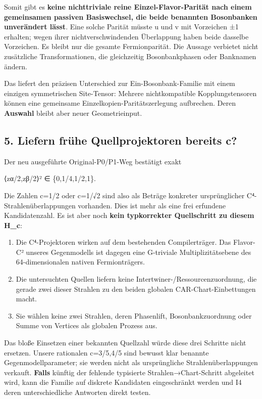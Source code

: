 Somit gibt es \textbf{keine nichttriviale reine Einzel-Flavor-Parität
nach einem gemeinsamen passiven Basiswechsel, die beide benannten
Bosonbanken unverändert lässt}. Eine solche Parität müsste u und v mit
Vorzeichen ±1 erhalten; wegen ihrer nichtverschwindenden Überlappung
haben beide dasselbe Vorzeichen. Es bleibt nur die gesamte
Fermionparität. Die Aussage verbietet nicht zusätzliche
Transformationen, die gleichzeitig Bosonbankphasen oder Banknamen
ändern.

Das liefert den präzisen Unterschied zur Ein-Bosonbank-Familie mit einem
einzigen symmetrischen Site-Tensor: Mehrere nichtkompatible
Kopplungstensoren können eine gemeinsame Einzelkopien-Paritätszerlegung
aufbrechen. Deren \textbf{Auswahl} bleibt aber neuer Geometrieinput.

\subsection{5. Liefern frühe Quellprojektoren bereits
c?}\label{liefern-fruxfche-quellprojektoren-bereits-c}

Der neu ausgeführte Original-P0/P1-Weg bestätigt exakt

\textbar⟨zα/2,zβ/2⟩\textbar² ∈ \{0,1/4,1/2,1\}.

Die Zahlen c=1/2 oder c=1/√2 sind also als Beträge konkreter
ursprünglicher C⁴-Strahlenüberlappungen vorhanden. Dies ist mehr als
eine frei erfundene Kandidatenzahl. Es ist aber noch \textbf{kein
typkorrekter Quellschritt zu diesem H\_c}:

\begin{enumerate}
\def\labelenumi{\arabic{enumi}.}
\tightlist
\item
  Die C⁴-Projektoren wirken auf dem bestehenden Compilerträger. Das
  Flavor-C² unseres Gegenmodells ist dagegen eine G-triviale
  Multiplizitätsebene des 64-dimensionalen nativen Fermionträgers.
\item
  Die untersuchten Quellen liefern keine
  Intertwiner-/Ressourcenzuordnung, die gerade zwei dieser Strahlen zu
  den beiden globalen CAR-Chart-Einbettungen macht.
\item
  Sie wählen keine zwei Strahlen, deren Phasenlift, Bosonbankzuordnung
  oder Summe von Vertices als globalen Prozess aus.
\end{enumerate}

Das bloße Einsetzen einer bekannten Quellzahl würde diese drei Schritte
nicht ersetzen. Unsere rationalen c=3/5,4/5 sind bewusst klar benannte
Gegenmodellparameter; sie werden nicht als ursprüngliche
Strahlenüberlappungen verkauft. \textbf{Falls} künftig der fehlende
typisierte Strahlen→Chart-Schritt abgeleitet wird, kann die Familie auf
diskrete Kandidaten eingeschränkt werden und I4 deren unterschiedliche
Antworten direkt testen.

